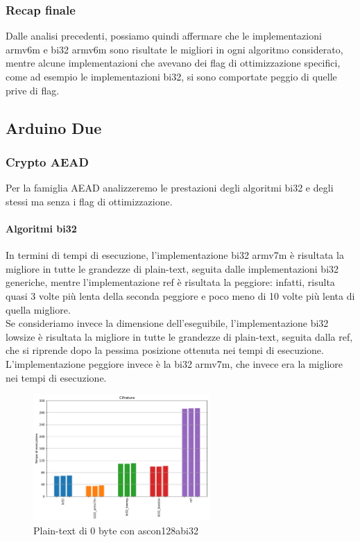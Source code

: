 \documentclass[12pt,a4paper,italian]{report}
\begin{document}
\subsubsection{Recap finale}

Dalle analisi precedenti, possiamo quindi affermare che le implementazioni armv6m e bi32 armv6m sono risultate le migliori in ogni algoritmo considerato, mentre alcune implementazioni che avevano dei flag di ottimizzazione specifici, come ad esempio le implementazioni bi32, si sono comportate peggio di quelle prive di flag.

\subsection{Arduino Due}

\subsubsection{Crypto AEAD}

Per la famiglia AEAD analizzeremo le prestazioni degli algoritmi bi32 e degli stessi ma senza i flag di ottimizzazione.

\paragraph{Algoritmi bi32}

In termini di tempi di esecuzione, l'implementazione bi32 armv7m è risultata la migliore in tutte le grandezze di plain-text, seguita dalle implementazioni bi32 generiche, mentre l'implementazione ref è risultata la peggiore: infatti, risulta quasi 3 volte più lenta della seconda peggiore e poco meno di 10 volte più lenta di quella migliore. \\

\noindent Se consideriamo invece la dimensione dell'eseguibile, l'implementazione bi32 lowsize è risultata la migliore in tutte le grandezze di plain-text, seguita dalla ref, che si riprende dopo la pessima posizione ottenuta nei tempi di esecuzione. L'implementazione peggiore invece è la bi32 armv7m, che invece era la migliore nei tempi di esecuzione.

\begin{figure}[H]
    \centering
    \includegraphics[width=0.6\textwidth]{arduino/ascon128abi32.pdf}
    \caption{Plain-text di 0 byte con ascon128abi32}
\end{figure}
\end{document}
